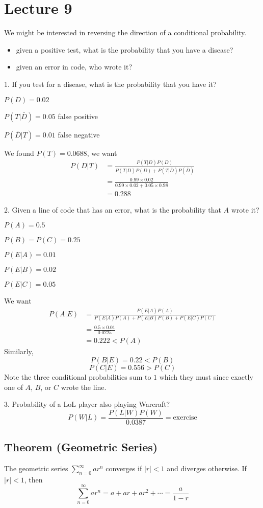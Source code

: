 \section{Lecture 9}
We might be interested in reversing the direction of a conditional
probability.
\begin{itemize}
    \item given a positive test, what is the probability that you have a disease?
    \item given an error in code, who wrote it?
\end{itemize}


1. If you test for a disease, what is the probability that you have it?

$ P(D)=0.02 $

$ P(T|\bar{D})=0.05 $ false positive

$ P(\bar{D}|T)=0.01 $ false negative

We found $ P(T)=0.0688 $, we want
\begin{align*}
    P(D|T)&=\frac{P(T|D)P(D)}{P(T|D)P(D)+P(T|\bar{D})P(\bar{D})}\\
    &=\frac{0.99\times 0.02}{0.99\times 0.02+0.05\times 0.98}\\
    &=0.288
\end{align*}

2. Given a line of code that has an error, what is the probability that
$ A $ wrote it?

$ P(A)=0.5 $

$ P(B)=P(C)=0.25 $

$ P(E|A)=0.01 $

$ P(E|B)=0.02 $

$ P(E|C)=0.05 $

We want
\begin{align*}
    P(A|E)&=\frac{P(E|A)P(A)}{P(E|A)P(A)+P(E|B)P(B)+P(E|C)P(C)}\\
    &=\frac{0.5\times 0.01}{0.0225}\\
    &=0.222<P(A)
\end{align*}
Similarly,
\[ P(B|E)=0.22<P(B) \]
\[ P(C|E)=0.556>P(C) \]
Note the three conditional probabilities sum to $ 1 $ which they must since exactly
one of $ A $, $ B $, or $ C $ wrote the line.

3. Probability of a LoL player also playing Warcraft?
\[ P(W|L)=\frac{P(L|W)P(W)}{0.0387}=\text{exercise} \]


\begin{thmbox}
    \subsection{Theorem (Geometric Series)}
    The geometric series $ \sum\limits_{n=0}^{\infty} ar^n $ converges
    if $ |r|<1 $ and diverges otherwise. If $ |r|<1 $, then
    \[ \sum\limits_{n=0}^{\infty} ar^n=a+ar+ar^2+\cdots =\frac{a}{1-r}  \]
\end{thmbox}

